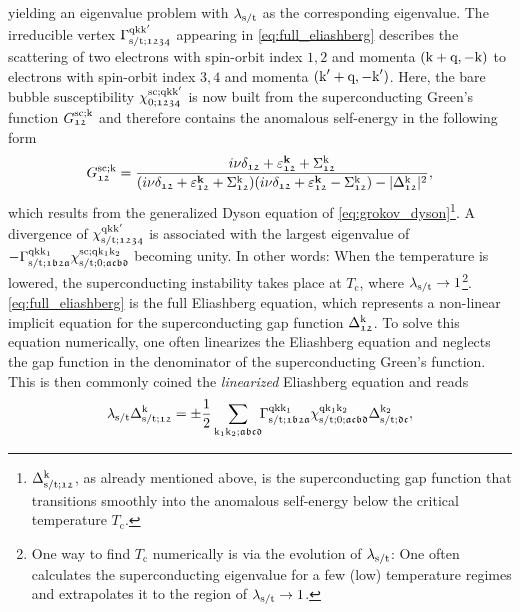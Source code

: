 \documentclass[../../main.tex]{subfiles}
\begin{document}
yielding an eigenvalue problem with $\lambda_{\text{s}/\text{t}}$ as the corresponding eigenvalue. The irreducible vertex $\Gamma^{\text{q}\text{k}\text{k}'}_{\text{s}/\text{t};\mathfrak{1234}}$ appearing in \eqref{eq:full_eliashberg} describes the scattering of two electrons with spin-orbit index $\mathfrak{1},\mathfrak{2}$ and momenta $(\text{k}+\text{q},-\text{k})$ to electrons with spin-orbit index $\mathfrak{3},\mathfrak{4}$ and momenta $(\text{k}'+\text{q},-\text{k}')$. Here, the bare bubble susceptibility $\chi^{\text{sc};\text{q}\text{k}\text{k}'}_{0;\mathfrak{1234}}$ is now built from the superconducting Green's function $G^{\text{sc};\text{k}}_{\mathfrak{12}}$ and therefore contains the anomalous self-energy in the following form
\begin{align}
	G^{\text{sc};\text{k}}_{\mathfrak{12}}=\frac{i\nu\delta_{\mathfrak{12}}+\varepsilon^{\textbf{k}}_{\mathfrak{12}}+\Sigma^{\text{k}}_{\mathfrak{12}}}{(i\nu\delta_{\mathfrak{12}}+\varepsilon^{\textbf{k}}_{\mathfrak{12}}+\Sigma^{\text{k}}_{\mathfrak{12}})(i\nu\delta_{\mathfrak{12}}+\varepsilon^{\textbf{k}}_{\mathfrak{12}}-\Sigma^{\text{k}}_{\mathfrak{12}})-|\Delta_{\mathfrak{12}}^{\text{k}}|^2},
\end{align}
which results from the generalized Dyson equation of \eqref{eq:grokov_dyson}\footnote{$\Delta_{\text{s}/\text{t};\mathfrak{12}}^{\text{k}}$, as already mentioned above, is the superconducting gap function that transitions smoothly into the anomalous self-energy below the critical temperature $T_\mathrm{c}$.}. A divergence of $\chi^{\text{q}\text{k}\text{k}'}_{\text{s}/\text{t};\mathfrak{1234}}$ is associated with the largest eigenvalue of $-\Gamma^{\text{q}\text{k}\text{k}_1}_{\text{s}/\text{t};\mathfrak{1b2a}}\chi^{\text{sc};\text{q}\text{k}_1\text{k}_2}_{\text{s}/\text{t};0;\mathfrak{acbd}}$ becoming unity. In other words: When the temperature is lowered, the superconducting instability takes place at $T_\mathrm{c}$, where $\lambda_{\text{s}/\text{t}}\to 1$\footnote{One way to find $T_\mathrm{c}$ numerically is via the evolution of $\lambda_{\text{s}/\text{t}}$: One often calculates the superconducting eigenvalue for a few (low) temperature regimes and extrapolates it to the region of $\lambda_{\text{s}/\text{t}}\to 1$.}. \eqref{eq:full_eliashberg} is the full Eliashberg equation, which represents a non-linear implicit equation for the superconducting gap function $\Delta_{\mathfrak{12}}^{\text{k}}$. To solve this equation numerically, one often linearizes the Eliashberg equation and neglects the gap function in the denominator of the superconducting Green's function. This is then commonly coined the \textit{linearized} Eliashberg equation and reads
\begin{align}\label{eq:linearized_eliashberg}
	\lambda_{\text{s}/\text{t}}\Delta_{\text{s}/\text{t};\mathfrak{12}}^{\text{k}}=\pm\frac{1}{2}\sum_{\text{k}_1\text{k}_2;\mathfrak{abcd}}\!\!\Gamma^{\text{q}\text{k}\text{k}_1}_{\text{s}/\text{t};\mathfrak{1b2a}}\chi^{\text{q}\text{k}_1\text{k}_2}_{\text{s}/\text{t};0;\mathfrak{acbd}}\Delta_{\text{s}/\text{t};\mathfrak{dc}}^{\text{k}_2},
\end{align}
\end{document}
